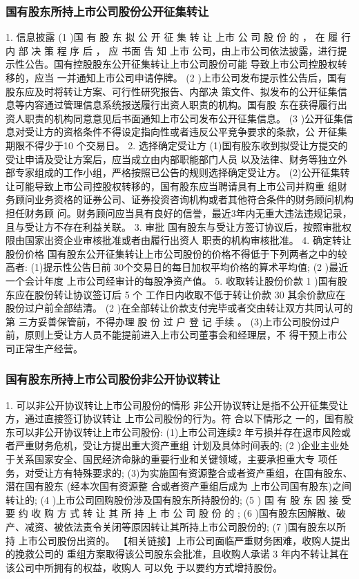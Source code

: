 \documentclass[UTF8,12pt]{ctexart}
\numberwithin{equation}{section} %
\numberwithin{figure}{section}
\numberwithin{table}{section}
\begin{document}
	\subsubsection{国有股东所持上市公司股份公开征集转让}
	1. 信息披露
	(1 )国 有 股 东 拟 公 开 征 集 转 让 上市 公 司 股 份 的 ， 在 履 行 内 部 决 策 程 序 后 ， 应 书面 告 知 上市
	公司，由上市公司依法披露，进行提示性公告。国有控股股东公开征集转让上市公司股份可能
	导致上市公司控股权转移的，应当 一并通知上市公司申请停牌。
	(2 )上市公司发布提示性公告后，国有股东应及时将转让方案、可行性研究报告、内部决
	策文件、拟发布的公开征集信息等内容通过管理信息系统报送履行出资人职责的机构。国有股
	东在获得履行出资人职责的机构同意意见后书面通知上市公司发布公开征集信息。
	(3 )公开征集信息对受让方的资格条件不得设定指向性或者违反公平竞争要求的条款，公
	开征集期限不得少于10 个交易日。
	2. 选择确定受让方
	(1)国有股东收到拟受让方提交的受让申请及受让方案后，应当成立由内部职能部门人员
	以及法律、财务等独立外部专家组成的工作小组，严格按照已公告的规则选择确定受让方。
	(2)公开征集转让可能导致上市公司控股权转移的，国有股东应当聘请具有上市公司并购重
	组财务顾问业务资格的证券公司、证券投资咨询机构或者其他符合条件的财务顾问机构担任财务顾
	问。财务顾问应当具有良好的信誉，最近3年内无重大违法违规记录，且与受让方不存在利益关联。
	3. 审批
	国有股东与受让方签订协议后，按照审批权限由国家出资企业审核批准或者由履行出资人
	职责的机构审核批准。
	4. 确定转让股份价格
	国有股东公开征集转让上市公司股份的价格不得低于下列两者之中的较高者:
	(1)提示性公告日前 30个交易日的每日加权平均价格的算术平均值;
	(2 )最近一个会计年度 上市公司经审计的每股净资产值。
	5. 收取转让股份价款
	1 )国有股东应在股份转让协议签订后 5 个 工作日内收取不低于转让价款 30%
	其余价款应在股份过户前全部结清。
	(2 )在全部转让价款支付完毕或者交由转让双方共同认可的第 三方妥善保管前，不得办理
	股 份 过 户 登 记 手续 。
	(3)上市公司股份过户前，原则上受让方人员不能提前进入上市公司董事会和经理层，不
	得干预上市公司正常生产经营。
	
	\subsubsection{国有股东所持上市公司股份非公开协议转让}
	1. 可以非公开协议转让上市公司股份的情形
	非公开协议转让是指不公开征集受让方，通过直接签订协议转让 上市公司股份的行为。符
	合以下情形之 一的，国有股东可以非公开协议转让上市公司股份:
	(1)上市公司连续2 年亏损并存在退市风险或者严重财务危机，受让方提出重大资产重组
	计划及具体时间表的;
	(2 )企业主业处于关系国家安全、国民经济命脉的重要行业和关键领域，主要承担重大专
	项任务，对受让方有特殊要求的;
	(3)为实施国有资源整合或者资产重组，在国有股东、潜在国有股东 (经本次国有资源整
	合或者资产重组后成为 上市公司国有股东)之间转让的;
	(4 )上市公司回购股份涉及国有股东所持股份的;
	(5 ) 国 有 股 东 因 接 受 要 约 收 购 方 式 转 让 其 所 持 上 市 公 司 股 份 的 ;
	(6 )国有股东因解散、破产、减资、被依法责令关闭等原因转让其所持上市公司股份的;
	(7 )国有股东以所持 上市公司股份出资的。
	【相关链接】上市公司面临严重财务困难，收购人提出的挽救公司的 重组方案取得该公司股东会批准，且收购人承诺 3 年内不转让其在该公司中所拥有的权益，收购人 可以免
	于以要约方式增持股份。
	
\end{document}
